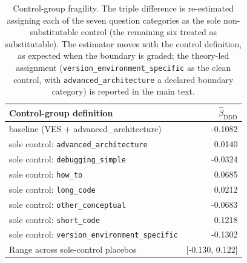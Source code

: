 \begin{table}[ht]
\centering
\caption{Control-group fragility. The triple difference is re-estimated assigning each of the seven question categories as the sole non-substitutable control (the remaining six treated as substitutable). The estimator moves with the control definition, as expected when the boundary is graded; the theory-led assignment (\texttt{version\_environment\_specific} as the clean control, with \texttt{advanced\_architecture} a declared boundary category) is reported in the main text.}
\label{tab:control_fragility}
\small
\begin{tabular}{lr}
\toprule
Control-group definition & $\hat\beta_{\text{DDD}}$ \\
\midrule
baseline (VES + advanced\_architecture) & -0.1082 \\
sole control: \texttt{advanced_architecture} & 0.0140 \\
sole control: \texttt{debugging_simple} & -0.0324 \\
sole control: \texttt{how_to} & 0.0685 \\
sole control: \texttt{long_code} & 0.0212 \\
sole control: \texttt{other_conceptual} & -0.0683 \\
sole control: \texttt{short_code} & 0.1218 \\
sole control: \texttt{version_environment_specific} & -0.1302 \\
\midrule
Range across sole-control placebos & [-0.130, 0.122] \\
\bottomrule
\end{tabular}
\end{table}